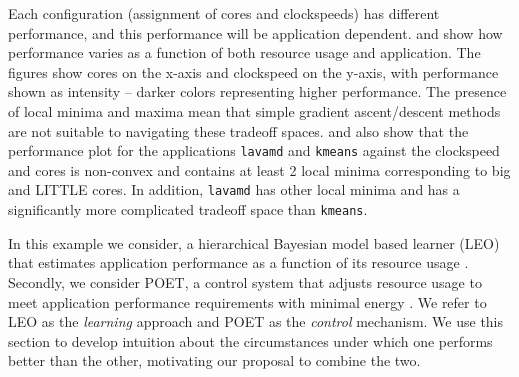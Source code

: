Each configuration (assignment of cores and clockspeeds) has different
performance, and this performance will be application dependent.
 and  show how
performance varies as a function of both resource usage and
application.  The figures show cores on the x-axis and clockspeed on
the y-axis, with performance shown as intensity -- darker colors
representing higher performance. The presence of local minima and
maxima mean that simple gradient ascent/descent methods are not
suitable to navigating these tradeoff spaces.
 and  also show
that the performance plot for the applications \texttt{lavamd} and
\texttt{kmeans} against the clockspeed and cores is non-convex and
contains at least 2 local minima corresponding to big and LITTLE
cores.  In addition, \texttt{lavamd} has other local minima and has a
significantly more complicated tradeoff space than \texttt{kmeans}.


In this example we consider, a hierarchical Bayesian model based
learner (LEO) that estimates application performance as a function of
its resource usage \cite{LEO}. Secondly, we consider POET, a control
system that adjusts resource usage to meet application performance
requirements with minimal energy \cite{POET}. We refer to LEO as the
\emph{learning} approach and POET as the \emph{control} mechanism.  We
use this section to develop intuition about the circumstances under
which one performs better than the other, motivating our proposal to
combine the two.

